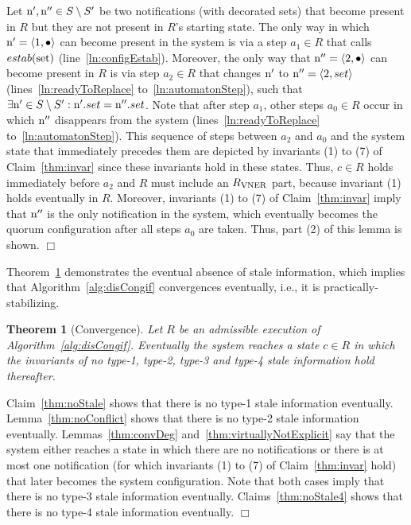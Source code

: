 \documentclass[11pt]{article}
\newcommand{\configEstab}{estab}
\newtheorem{theorem}{Theorem}[section]
\newenvironment{proof}{\noindent{\bf Proof.}}{\hfill$\Box$}
\begin{document}
\begin{proof}
Let $\textnormal{n}',\textnormal{n}'' \in S \setminus S'$ be two notifications (with decorated sets) that become present in $R$ but they are not present in $R$'s starting state. The only way in which  $\textnormal{n}'=\langle 1, \bullet \rangle$ can become present in the system is via a step $a_1 \in R$ that calls $\configEstab(\textnormal{set})$ (line~\ref{ln:configEstab}). Moreover, the only way that $\textnormal{n}''=\langle 2, \bullet \rangle$ can become present in $R$ is via step $a_2 \in R$ that changes $\textnormal{n}'$ to $\textnormal{n}'' = \langle 2, set \rangle$ (lines~\ref{ln:readyToReplace} to~\ref{ln:automatonStep}), such that $\exists \textnormal{n}' \in S \setminus S' : \textnormal{n}'.set=\textnormal{n}''.set$. 
Note that after step $a_1$, other steps $a_0 \in R$ occur in which $\textnormal{n}''$ disappears from the system (lines~\ref{ln:readyToReplace} to~\ref{ln:automatonStep}). This sequence of steps between $a_2$ and $a_0$ and the system state that immediately precedes them are depicted by invariants (1) to (7) of Claim~\ref{thm:invar} since these invariants hold in these states. Thus, $c \in R$ holds immediately before $a_2$ and $R$ must include an $R_{\textnormal{VNER}}$ part, because invariant (1) holds eventually in $R$. Moreover, invariants (1) to (7) of Claim~\ref{thm:invar} imply that $\textnormal{n}''$ is the only notification in the system, which eventually becomes the quorum configuration after all steps $a_0$ are taken. Thus, part (2) of this lemma is shown.  
\end{proof}




Theorem~\ref{thm:staleFreeExecution} demonstrates the eventual absence of stale information, which implies that Algorithm~\ref{alg:disCongif} convergences eventually, i.e., it is practically-stabilizing. 

\begin{theorem}[Convergence] 
\label{thm:staleFreeExecution}
Let $R$ be an admissible execution of Algorithm~\ref{alg:disCongif}.
Eventually the system reaches a state $c \in R$ in which the invariants of no type-1, type-2, type-3 and type-4 stale information hold thereafter.  
\end{theorem}
\begin{proof}
Claim~\ref{thm:noStale} shows that there is no type-1 stale information  eventually. 
Lemma~\ref{thm:noConflict} shows that there is no type-2 stale information  eventually. 
Lemmas~\ref{thm:convDeg} and~\ref{thm:virtuallyNotExplicit} say that the system either reaches a state in which there are no notifications or there is at most one notification (for which invariants (1) to (7) of Claim~\ref{thm:invar} hold) that later  becomes the system configuration. Note that both cases imply that there is no type-3 stale information  eventually. 
Claims~\ref{thm:noStale4} shows that there is no type-4 stale information  eventually. 
\end{proof} 
 
\end{document}

